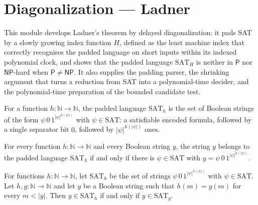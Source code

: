\section{Diagonalization --- Ladner}
This module develops Ladner's theorem by delayed diagonalization: it pads SAT by a
slowly growing index function $H$, defined as the least machine index that correctly
recognises the padded language on short inputs within its indexed polynomial clock,
and shows that the padded language $\mathrm{SAT}_H$ is neither in $\mathsf{P}$ nor
$\mathsf{NP}$-hard when $\mathsf{P}\ne\mathsf{NP}$. It also supplies the padding parser,
the shrinking argument that turns a reduction from SAT into a polynomial-time decider,
and the polynomial-time preparation of the bounded candidate test.

\begin{definition}
\label{Complexity.padSAT}
\leanok
{}
For a function $h:\mathbb N\to\mathbb N$, the padded language $\mathrm{SAT}_h$ is the set
of Boolean strings of the form $\psi\,0\,1^{|\psi|^{h(|\psi|)}}$ with $\psi\in\mathrm{SAT}$:
a satisfiable encoded formula, followed by a single separator bit $0$, followed by
$|\psi|^{h(|\psi|)}$ ones.
\end{definition}

\begin{theorem}
\label{Complexity.mem_padSAT_iff}
\leanok
{}
For every function $h:\mathbb N\to\mathbb N$ and every Boolean string $y$, the string $y$
belongs to the padded language $\mathrm{SAT}_h$ if and only if there is $\psi\in\mathrm{SAT}$
with $y=\psi\,0\,1^{|\psi|^{h(|\psi|)}}$.
\end{theorem}

\begin{theorem}
\label{Complexity.padSAT_congr}
\leanok
{}
For functions $h:\mathbb N\to\mathbb N$, let $\mathrm{SAT}_h$ be the set of strings
$\psi\,0\,1^{|\psi|^{h(|\psi|)}}$ with $\psi\in\mathrm{SAT}$. Let $h,g:\mathbb N\to\mathbb N$
and let $y$ be a Boolean string such that $h(m)=g(m)$ for every $m<|y|$. Then
$y\in\mathrm{SAT}_h$ if and only if $y\in\mathrm{SAT}_g$.
\end{theorem}

